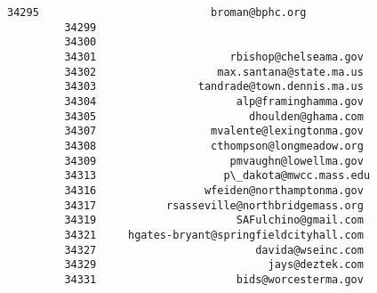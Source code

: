 \documentclass[11pt]{article}
\begin{document}
\begin{Verbatim}[commandchars=\\\{\}]
         34295                           broman@bphc.org   
         34299                                             
         34300                                             
         34301                     rbishop@chelseama.gov   
         34302                   max.santana@state.ma.us   
         34303                tandrade@town.dennis.ma.us   
         34304                      alp@framinghamma.gov   
         34305                        dhoulden@ghama.com   
         34307                  mvalente@lexingtonma.gov   
         34308                  cthompson@longmeadow.org   
         34309                     pmvaughn@lowellma.gov   
         34313                    p\_dakota@mwcc.mass.edu   
         34316                 wfeiden@northamptonma.gov   
         34317           rsasseville@northbridgemass.org   
         34319                      SAFulchino@gmail.com   
         34321     hgates-bryant@springfieldcityhall.com   
         34327                         davida@wseinc.com   
         34329                           jays@deztek.com   
         34331                      bids@worcesterma.gov   
         

\end{Verbatim}
\end{document}
